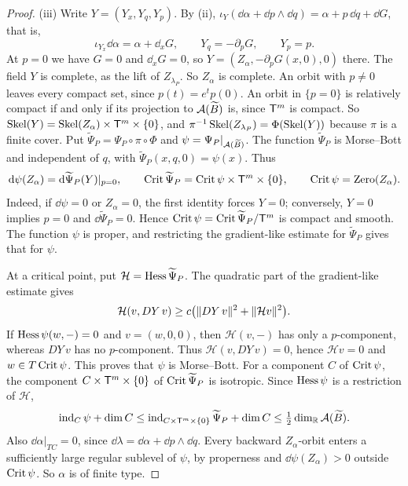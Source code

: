 \documentclass[12pt, letter]{amsart}
\theoremstyle{definition}
\begin{document}
\begin{proof}
(iii) Write $Y=(Y_x,Y_q,Y_p)$.
By (ii), $\iota_Y(\dd\alpha+\dd p\wedge \dd q)=\alpha+p\,\dd q+\dd G$, that is,
\[
 \iota_{Y_x}\dd\alpha=\alpha+\dd_xG,\qquad Y_q=-\partial_pG,\qquad Y_p=p .
\]
At $p=0$ we have $G=0$ and $\dd_xG=0$, so $Y=(Z_\alpha,-\partial_pG(x,0),0)$ there.
The field $Y$ is complete, as the lift of $Z_{\lambda_P}$.
So $Z_\alpha$ is complete.
An orbit with $p\ne0$ leaves every compact set, since $p(t)=e^tp(0)$.
An orbit in $\{p=0\}$ is relatively compact if and only if its projection to $\mathcal{A}(\widetilde B)$ is, since $\mathsf T^m$ is compact.
So $\operatorname{Skel}(Y)=\operatorname{Skel}(Z_\alpha)\times\mathsf T^m\times\{0\}$, and $\pi^{-1}\operatorname{Skel}(Z_{\lambda_P})=\Phi(\operatorname{Skel}(Y))$ because $\pi$ is a finite cover.
Put $\widetilde\Psi_P=\Psi_P\circ\pi\circ\Phi$ and $\psi=\Psi_P|_{\mathcal{A}(\widetilde B)}$.
The function $\widetilde\Psi_P$ is Morse--Bott and independent of $q$, with $\widetilde\Psi_P(x,q,0)=\psi(x)$.
Thus
\[
 \mathrm{d}\psi(Z_\alpha)=\mathrm{d}\widetilde\Psi_P(Y)|_{p=0},\qquad
 \operatorname{Crit}\widetilde\Psi_P=\operatorname{Crit}\psi\times\mathsf T^m\times\{0\},\qquad \operatorname{Crit}\psi=\operatorname{Zero}(Z_\alpha).
\]
Indeed, if $\dd\psi=0$ or $Z_\alpha=0$, the first identity forces $Y=0$; conversely, $Y=0$ implies $p=0$ and $\dd\widetilde\Psi_P=0$.
Hence $\operatorname{Crit}\psi=\operatorname{Crit}\widetilde\Psi_P/\mathsf T^m$ is compact and smooth.
The function $\psi$ is proper, and restricting the gradient-like estimate for $\widetilde\Psi_P$ gives that for $\psi$.

At a critical point, put $\mathcal H=\operatorname{Hess}\widetilde\Psi_P$.
The quadratic part of the gradient-like estimate gives
\[
 \mathcal H(v,DY\,v)\ge c\bigl(\lVert DY\,v\rVert^2+\lVert \mathcal Hv\rVert^2\bigr).
\]
If $\operatorname{Hess}\psi(w,-)=0$ and $v=(w,0,0)$, then $\mathcal H(v,-)$ has only a $p$-component, whereas $DY\,v$ has no $p$-component.
Thus $\mathcal H(v,DY\,v)=0$, hence $\mathcal Hv=0$ and $w\in T\operatorname{Crit}\psi$.
This proves that $\psi$ is Morse--Bott.
For a component $C$ of $\operatorname{Crit}\psi$, the component $C\times\mathsf T^m\times\{0\}$ of $\operatorname{Crit}\widetilde\Psi_P$ is isotropic.
Since $\operatorname{Hess}\psi$ is a restriction of $\mathcal H$,
\[
 \operatorname{ind}_C\psi+\dim C
 \le \operatorname{ind}_{C\times\mathsf T^m\times\{0\}}\widetilde\Psi_P+\dim C
 \le\tfrac12\dim_{\mathbb{R}}\mathcal{A}(\widetilde B).
\]
Also $\dd\alpha|_{TC}=0$, since $\dd\lambda=\dd\alpha+\dd p\wedge\dd q$.
Every backward $Z_\alpha$-orbit enters a sufficiently large regular sublevel of $\psi$, by properness and $\dd\psi(Z_\alpha)>0$ outside $\operatorname{Crit}\psi$.
So $\alpha$ is of finite type.


\end{proof}
\end{document}
